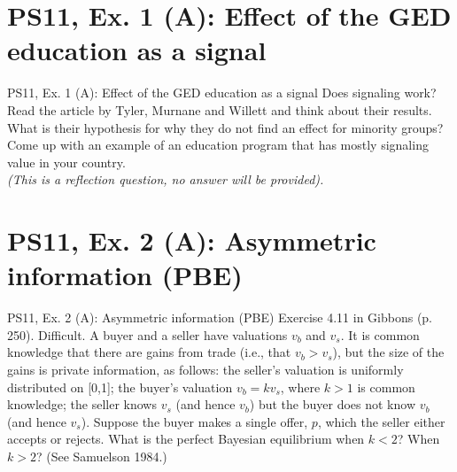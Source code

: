 \section{PS11, Ex. 1 (A): Effect of the GED education as a signal}

\begin{frame}{PS11, Ex. 1 (A): Effect of the GED education as a signal}
    Does signaling work? Read the article by Tyler, Murnane and Willett and think about
    their results. What is their hypothesis for why they do not find an effect for minority groups? Come up with an example of an education program that has mostly signaling value in your country.\\\medskip
    \textit{(This is a reflection question, no answer will be provided).}
    \vfill\null
\end{frame}



\section{PS11, Ex. 2 (A): Asymmetric information (PBE)}

\begin{frame}{PS11, Ex. 2 (A): Asymmetric information (PBE)}
    Exercise 4.11 in Gibbons (p. 250). Difficult. A buyer and a seller have valuations $v_b$ and $v_s$. It is common knowledge that there are gains from trade (i.e., that $v_b > v_s$), but the size of the gains is private information, as follows: the seller’s valuation is uniformly distributed on [0,1]; the buyer’s valuation $v_b = kv_s$, where $k > 1$ is common knowledge; the seller knows $v_s$ (and hence $v_b$) but the buyer does not know $v_b$ (and hence $v_s$). Suppose the buyer makes a single offer, $p$, which the seller either accepts or rejects. What is the perfect Bayesian equilibrium when $k < 2$? When $k > 2$? (See Samuelson 1984.)
    \vfill\null
\end{frame}

